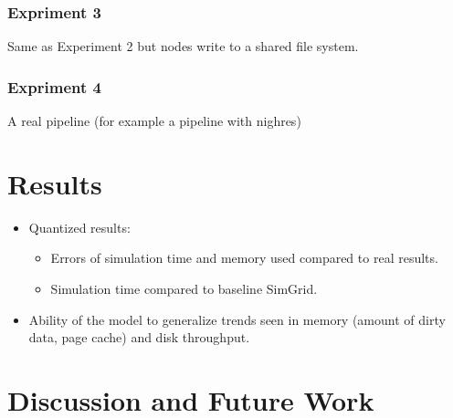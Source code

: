 \documentclass[conference]{IEEEtran}
\begin{document}
			\subsubsection{Expriment 3}
				Same as Experiment 2 but nodes write to a shared file system.
			\subsubsection{Expriment 4}
				A real pipeline (for example a pipeline with nighres)

	\section{Results}
	
		\begin{itemize}

			\item Quantized results: 
				\begin{itemize}
					\item Errors of simulation time and memory used compared to real results.
					\item Simulation time compared to baseline SimGrid.
				\end{itemize} 

			\item Ability of the model to generalize trends seen in memory (amount of dirty data, page cache) and disk throughput.

		\end{itemize}

	\section{Discussion and Future Work}
\end{document}
